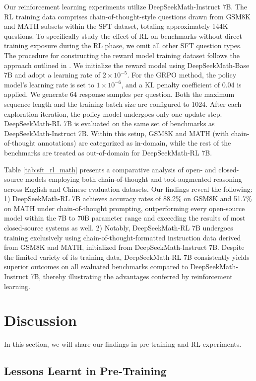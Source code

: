 \begin{itemize}[topsep=0pt]
Our reinforcement learning experiments utilize DeepSeekMath-Instruct 7B. The RL training data comprises chain-of-thought-style questions drawn from GSM8K and MATH subsets within the SFT dataset, totaling approximately 144K questions. To specifically study the effect of RL on benchmarks without direct training exposure during the RL phase, we omit all other SFT question types. The procedure for constructing the reward model training dataset follows the approach outlined in \citep{wang2023math}. We initialize the reward model using DeepSeekMath-Base 7B and adopt a learning rate of $2 \times 10^{-5}$. For the GRPO method, the policy model's learning rate is set to $1 \times 10^{-6}$, and a KL penalty coefficient of 0.04 is applied. We generate $64$ response samples per question. Both the maximum sequence length and the training batch size are configured to 1024. After each exploration iteration, the policy model undergoes only one update step. DeepSeekMath-RL 7B is evaluated on the same set of benchmarks as DeepSeekMath-Instruct 7B. Within this setup, GSM8K and MATH (with chain-of-thought annotations) are categorized as in-domain, while the rest of the benchmarks are treated as out-of-domain for DeepSeekMath-RL 7B.

Table \ref{tab:sft_rl_math} presents a comparative analysis of open- and closed-source models employing both chain-of-thought and tool-augmented reasoning across English and Chinese evaluation datasets. Our findings reveal the following: 1) DeepSeekMath-RL 7B achieves accuracy rates of 88.2\% on GSM8K and 51.7\% on MATH under chain-of-thought prompting, outperforming every open-source model within the 7B to 70B parameter range and exceeding the results of most closed-source systems as well. 2) Notably, DeepSeekMath-RL 7B undergoes training exclusively using chain-of-thought-formatted instruction data derived from GSM8K and MATH, initialized from DeepSeekMath-Instruct 7B. Despite the limited variety of its training data, DeepSeekMath-RL 7B consistently yields superior outcomes on all evaluated benchmarks compared to DeepSeekMath-Instruct 7B, thereby illustrating the advantages conferred by reinforcement learning.

\section{Discussion}
In this section, we will share our findings in pre-training and RL experiments. 

\subsection{Lessons Learnt in Pre-Training}


\end{itemize}
